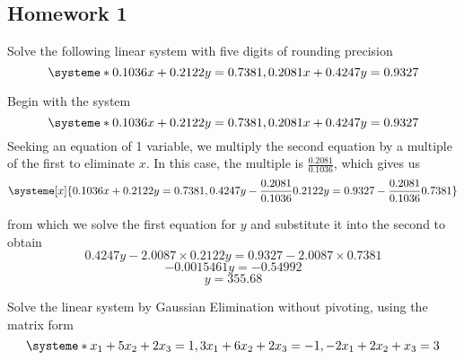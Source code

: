 \subsection*{Homework 1}
\begin{problem}
  Solve the following linear system with five digits of rounding precision
  \[
\systeme*{0.1036x + 0.2122y = 0.7381, 0.2081x + 0.4247y = 0.9327}
\]
\end{problem}

\begin{solution}
  Begin with the system
  \[
\systeme*{0.1036x + 0.2122y = 0.7381, 0.2081x + 0.4247y = 0.9327}
\]
  Seeking an equation of 1 variable, we multiply the second equation by a
  multiple of the first to eliminate \(x\). In this case, the multiple is
  \(\frac{0.2081}{0.1036}\), which gives us
  \[
\systeme[x]{0.1036x + 0.2122y = 0.7381, 0.4247y -
      \frac{0.2081}{0.1036}0.2122y = 0.9327 - \frac{0.2081}{0.1036}0.7381}
\]

  from which we solve the first equation for \(y\) and substitute it into the
  second to obtain
  \[
0.4247y - 2.0087 \times 0.2122y = 0.9327 - 2.0087 \times 0.7381
\]
  \[
-0.0015461y = -0.54992
\]
  \[
y = 355.68
\]
\end{solution}

\begin{problem}
  Solve the linear system by Gaussian Elimination without pivoting, using the
  matrix form
  \[
\systeme*{x_{1} + 5x_{2} + 2x_{3} = 1, 3x_{1} + 6x_{2} + 2x_{3} = -1,
      -2x_{1} + 2x_{2} + x_{3} = 3}
\]
\end{problem}

